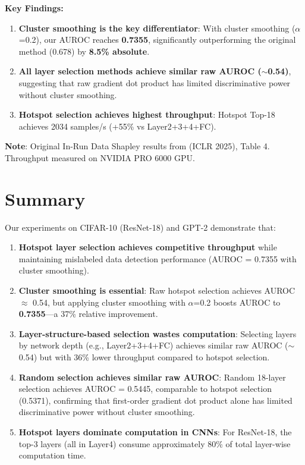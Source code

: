 \documentclass[12pt,a4paper]{report}
\begin{document}
\bigskip
\noindent \textbf{Key Findings:}

\begin{enumerate}
    \item \textbf{Cluster smoothing is the key differentiator}: With cluster smoothing ($\alpha$=0.2), our AUROC reaches \textbf{0.7355}, significantly outperforming the original method (0.678) by \textbf{8.5\% absolute}.
    
    \item \textbf{All layer selection methods achieve similar raw AUROC ($\sim$0.54)}, suggesting that raw gradient dot product has limited discriminative power without cluster smoothing.
    
    \item \textbf{Hotspot selection achieves highest throughput}: Hotspot Top-18 achieves 2034 samples/s (+55\% vs Layer2+3+4+FC).
\end{enumerate}

\bigskip
\noindent \textbf{Note}: Original In-Run Data Shapley results from \citet{wang2025data} (ICLR 2025), Table 4. Throughput measured on NVIDIA PRO 6000 GPU.

\section{Summary}
\label{sec:exp_summary}

Our experiments on CIFAR-10 (ResNet-18) and GPT-2 demonstrate that:

\begin{enumerate}
    \item \textbf{Hotspot layer selection achieves competitive throughput} while maintaining mislabeled data detection performance (AUROC = 0.7355 with cluster smoothing).
    
    \item \textbf{Cluster smoothing is essential}: Raw hotspot selection achieves AUROC $\approx$ 0.54, but applying cluster smoothing with $\alpha$=0.2 boosts AUROC to \textbf{0.7355}---a 37\% relative improvement.
    
    \item \textbf{Layer-structure-based selection wastes computation}: Selecting layers by network depth (e.g., Layer2+3+4+FC) achieves similar raw AUROC ($\sim$0.54) but with 36\% lower throughput compared to hotspot selection.
    
    \item \textbf{Random selection achieves similar raw AUROC}: Random 18-layer selection achieves AUROC = 0.5445, comparable to hotspot selection (0.5371), confirming that first-order gradient dot product alone has limited discriminative power without cluster smoothing.
    
    \item \textbf{Hotspot layers dominate computation in CNNs}: For ResNet-18, the top-3 layers (all in Layer4) consume approximately 80\% of total layer-wise computation time.
\end{enumerate}
\end{document}
